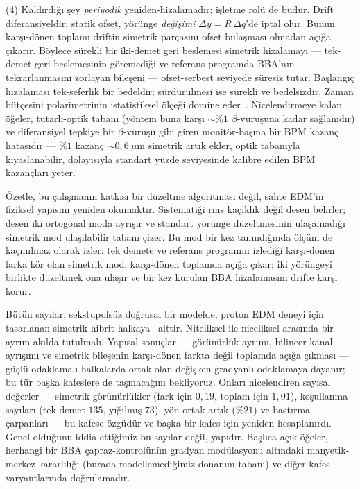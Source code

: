 \documentclass[aps,prab,reprint,superscriptaddress,nofootinbib]{revtex4-2}
\begin{document}
(4) Kaldırdığı şey \emph{periyodik} yeniden-hizalamadır; işletme rolü de budur. Drift
diferansiyeldir: statik ofset, yörünge \emph{değişimi} $\Delta y = R\,\Delta q$'de
iptal olur. Bunun karşı-dönen toplamı driftin simetrik parçasını ofset bulaşması
olmadan açığa çıkarır. Böylece sürekli bir iki-demet geri beslemesi simetrik hizalamayı
--- tek-demet geri beslemesinin göremediği ve referans programda BBA'nın tekrarlanmasını
zorlayan bileşeni --- ofset-serbest seviyede süresiz tutar. Başlangıç hizalaması
tek-seferlik bir bedeldir; sürdürülmesi ise sürekli ve bedelsizdir. Zaman bütçesini
polarimetrinin istatistiksel ölçeği domine eder~\cite{polarimeter}. Nicelendirmeye
kalan öğeler, tutarlı-optik tabanı (yöntem buna karşı $\sim\!\%1$ $\beta$-vuruşuna
kadar sağlamdır) ve diferansiyel tepkiye bir $\beta$-vuruşu gibi giren monitör-başına
bir BPM kazanç hatasıdır --- $\%1$ kazanç $\sim\!0{,}6~\mu$m simetrik artık ekler,
optik tabanıyla kıyaslanabilir, dolayısıyla standart yüzde seviyesinde kalibre edilen
BPM kazançları yeter.

Özetle, bu çalışmanın katkısı bir düzeltme algoritması değil, sahte EDM'in fiziksel
yapısını yeniden okumaktır. Sistematiği rms kaçıklık değil desen belirler; desen iki
ortogonal moda ayrışır ve standart yörünge düzeltmesinin ulaşamadığı simetrik mod
ulaşılabilir tabanı çizer. Bu mod bir kez tanındığında ölçüm de kaçınılmaz olarak
izler: tek demete ve referans programın izlediği karşı-dönen farka kör olan simetrik
mod, karşı-dönen toplamda açığa çıkar; iki yörüngeyi birlikte düzeltmek ona ulaşır ve
bir kez kurulan BBA hizalamasını drifte karşı korur.

Bütün sayılar, sekstupolsüz doğrusal bir modelde, proton EDM deneyi için tasarlanan
simetrik-hibrit halkaya~\cite{omarov} aittir. Niteliksel ile niceliksel arasında bir
ayrım akılda tutulmalı. Yapısal sonuçlar --- görünürlük ayrımı, bilineer kanal
ayrışımı ve simetrik bileşenin karşı-dönen farkta değil toplamda açığa çıkması ---
güçlü-odaklamalı halkalarda ortak olan değişken-gradyanlı odaklamaya dayanır; bu tür
başka kafeslere de taşınacağını bekliyoruz. Onları nicelendiren sayısal değerler ---
simetrik görünürlükler (fark için $0{,}19$, toplam için $1{,}01$), koşullanma sayıları
(tek-demet $135$, yığılmış $73$), yön-ortak artık ($\%21$) ve bastırma çarpanları ---
bu kafese özgüdür ve başka bir kafes için yeniden hesaplanırdı. Genel olduğunu iddia
ettiğimiz bu sayılar değil, yapıdır. Başlıca açık öğeler, herhangi bir BBA
çapraz-kontrolünün gradyan modülasyonu altındaki manyetik-merkez kararlılığı (burada
modellemediğimiz donanım tabanı) ve diğer kafes varyantlarında doğrulamadır.
\end{document}
